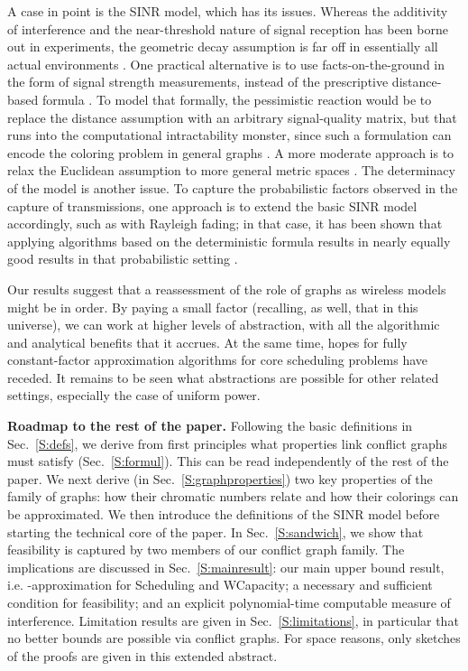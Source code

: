 \documentclass[11pt]{article}
\newcommand{\mypara}[1]{\smallskip\noindent\textbf{#1.}}  \newcommand{\tightpara}[1]{\noindent\textbf{#1.}}
\newcommand{\wcapacity}{\textsf{WCapacity}}
\newcommand{\scheduling}{\textsf{Scheduling}}
\begin{document}
A case in point is the SINR model, which has its issues.  Whereas the additivity of interference and the near-threshold
nature of signal reception has been borne out in experiments, the geometric decay assumption is far off in essentially
all actual environments \cite{son2006,MaheshwariJD08,sevani2012sir,us:MSWiM14}.  One practical alternative is to use
facts-on-the-ground in the form of signal strength measurements, instead of the prescriptive distance-based formula
\cite{us:MSWiM14,us:PODC14}.  To model that formally, the pessimistic reaction would be to replace the distance
assumption with an arbitrary signal-quality matrix, but that runs into the computational intractability monster, since
such a formulation can encode the coloring problem in general graphs \cite{GoussevskaiaHW14}.  A more moderate
approach is to relax the Euclidean assumption to more general metric spaces \cite{fangkeslinear}.  
The determinacy of the model is another issue.  To capture the probabilistic factors observed in the capture of
transmissions, one approach is to extend the basic SINR model accordingly, such as with Rayleigh fading; in that case,
it has been shown that applying algorithms based on the deterministic formula results in nearly equally good results in
that probabilistic setting \cite{damskesrayleigh}.

Our results suggest that a reassessment of the role of graphs as wireless models might be in order.
By paying a small factor (recalling, as well, that  in this universe),
we can work at higher levels of abstraction, with all the algorithmic and analytical benefits that it accrues.
At the same time, hopes for fully constant-factor approximation algorithms for core scheduling problems have receded.
It remains to be seen what abstractions are possible for other related settings, especially the case of uniform power.



\mypara{Roadmap to the rest of the paper}
Following the basic definitions in Sec.~\ref{S:defs}, we derive from first principles what properties link conflict
graphs must satisfy (Sec.~\ref{S:formul}). This can be read independently of the rest of the paper.
We next derive (in Sec.~\ref{S:graphproperties}) two key properties of the family of graphs: how their chromatic numbers
relate and how their colorings can be approximated. We then introduce the definitions of the SINR model
before starting the technical core of the paper.
In Sec.~\ref{S:sandwich}, we show that feasibility is captured by two members of our conflict graph family. 
The implications are discussed in Sec.~\ref{S:mainresult}:
our main upper bound result, i.e. -approximation for {\scheduling} and {\wcapacity}; a necessary and sufficient condition for feasibility; and an explicit
polynomial-time computable measure of interference.
Limitation results are given in Sec.~\ref{S:limitations}, in particular 
that no better bounds are possible via conflict graphs.
For space reasons, only sketches of the proofs are given in this extended abstract.
\end{document}

